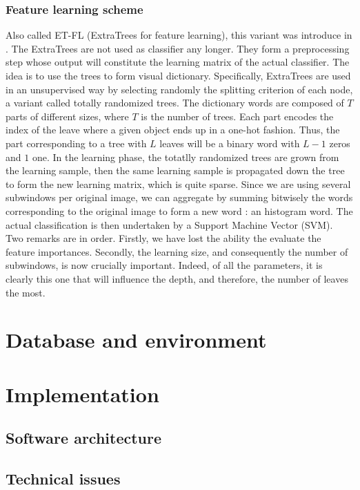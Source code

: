 \documentclass[a4paper]{report}
\begin{document}
			\subsubsection{Feature learning scheme}
			Also called ET-FL (ExtraTrees for feature learning), this variant was introduce in \cite{ETFL}. The ExtraTrees are not used as classifier any longer. They form a preprocessing step whose output will constitute the learning matrix of the actual classifier. The idea is to use the trees to form visual dictionary. Specifically, ExtraTrees are used in an unsupervised way by selecting randomly the splitting criterion of each node, a variant called totally randomized trees. The dictionary words are composed of $T$ parts of different sizes, where $T$ is the number of trees. Each part encodes the index of the leave where a given object ends up in a one-hot fashion. Thus, the part corresponding to a tree with $L$ leaves will be a binary word with $L-1$ zeros and $1$ one. In the learning phase, the totatlly randomized trees are grown from the learning sample, then the same learning sample is propagated down the tree to form the new learning matrix, which is quite sparse. Since we are using several subwindows per original image, we can aggregate by summing bitwisely the words corresponding to the original image to form a new word : an histogram word.
			The actual classification is then undertaken by a Support Machine Vector (SVM). %
			Two remarks are in order. Firstly, we have lost the ability the evaluate the feature importances. Secondly, the learning size, and consequently the number of subwindows, is now crucially important. Indeed, of all the parameters, it is clearly this one that will influence the depth, and therefore, the number of leaves the most. 
			
	\section{Database and environment}
	\section{Implementation}
		\subsection{Software architecture}
		\subsection{Technical issues}
		
\end{document}
